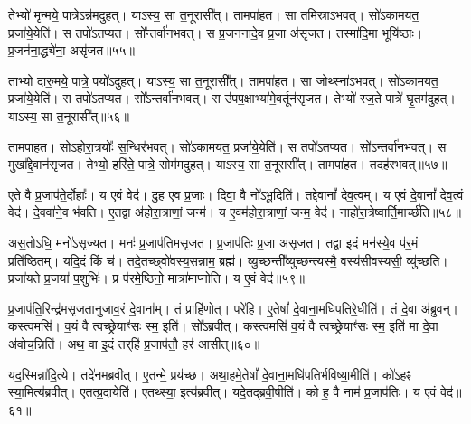 तेभ्यो॑ मृ॒न्मये॒ पात्रे\-ऽन्न॑मदुहत्।
याऽस्य॒ सा त॒नूरासी᳚त्।
तामपा॑हत।
सा तमि॑स्रा\-ऽभवत्।
सो॑ऽकामयत॒ प्रजा॑ये॒येति॑।
स तपो॑\-ऽतप्यत।
सो᳚न्तर्वा॑नभवत्।
स प्र॒जन॑नादे॒व प्र॒जा अ॑\-सृजत।
तस्मा॑दि॒मा भूयि॑ष्ठाः।
प्र॒जन॑ना॒द्ध्ये॑ना॒ असृ॑जत॥५५॥\ip

ताभ्यो॑ दारु॒मये॒ पात्रे॒ पयो॑\-ऽदुहत्।
याऽस्य॒ सा त॒नूरासी᳚त्।
तामपा॑हत।
सा जोथ्स्ना॑\-ऽभवत्।
सो॑ऽकामयत॒ प्रजा॑ये॒येति॑।
स तपो॑\-ऽतप्यत।
सो᳚ऽन्तर्वा॑नभवत्।
स उ॑पप॒क्षाभ्या॑मे॒वर्तून॑\-सृजत।
तेभ्यो॑ रज॒ते पात्रे॑ घृ॒तम॑दुहत्।
याऽस्य॒ सा त॒नूरासी᳚त्॥५६॥\ip

तामपा॑हत।
सो॑ऽहोरा॒त्रयोः᳚ स॒न्धिर॑भवत्।
सो॑ऽकामयत॒ प्रजा॑ये॒येति॑।
स तपो॑\-ऽतप्यत।
सो᳚ऽन्तर्वा॑नभवत्।
स मुखा᳚द्दे॒वान॑\-सृजत।
तेभ्यो॒ हरि॑ते॒ पात्रे॒ सोम॑मदुहत्।
याऽस्य॒ सा त॒नूरासी᳚त्।
तामपा॑हत।
तदह॑रभवत्॥५७॥\ip

ए॒ते वै प्र॒जा\-प॑ते॒र्दोहाः᳚।
य ए॒वं वेद॑।
दु॒ह ए॒व प्र॒जाः।
दिवा॒ वै नो॑\-ऽभू॒दिति॑।
तद्दे॒वानां᳚ देव॒त्वम्।
य ए॒वं दे॒वानां᳚ देव॒त्वं वेद॑।
दे॒ववा॑ने॒व भ॑वति।
ए॒तद्वा अ॑होरा॒त्राणां॒ जन्म॑।
य ए॒वम॑होरा॒त्राणां॒ जन्म॒ वेद॑।
नाहो॑रा॒त्रेष्वार्ति॒मार्च्छ॑ति॥५८॥\ip

अस॒तोऽधि॒ मनो॑\-ऽसृज्यत।
मनः॑ प्र॒जा\-प॑तिम\-सृजत।
प्र॒जा\-प॑तिः प्र॒जा अ॑\-सृजत।
तद्वा इ॒दं मन॑स्ये॒व प॑र॒मं प्रति॑\-ष्ठितम्।
यदि॒दं किं च॑।
तदे॒तच्छ्वो॑वस्य॒सन्नाम॒ ब्रह्म॑।
व्यु॒च्छन्ती᳚व्युच्छन्त्यस्मै॒ वस्य॑सीवस्यसी॒ व्यु॑च्छति।
प्रजा॑यते प्र॒जया॑ प॒शुभिः॑।
प्र प॑रमे॒ष्ठिनो॒ मात्रा॑माप्नोति।
य ए॒वं वेद॑॥५९॥\ip{}

प्र॒जा\-प॑ति॒रिन्द्र॑म\-सृजतानुजाव॒रं दे॒वाना᳚म्।
तं प्राहि॑णोत्।
परे॑हि।
ए॒तेषां᳚ दे॒वाना॒मधि॑पतिरे॒धीति॑।
तं दे॒वा अ॑ब्रुवन्।
कस्त्वमसि॑।
व॒यं वै त्वच्छ्रेयाꣳ॑सः स्म॒ इति॑।
सो᳚ऽब्रवीत्।
कस्त्वमसि॑ व॒यं वै त्वच्छ्रेयाꣳ॑सः स्म॒ इति॑ मा दे॒वा अ॑वोच॒न्निति॑।
अथ॒ वा इ॒दं तर्‌\mbox{}हि॑ प्र॒जा\-प॑तौ॒ हर॑ आसीत्॥६०॥\ip

यद॒स्मिन्ना॑दि॒त्ये।
तदे॑नमब्रवीत्।
ए॒तन्मे॒ प्रय॑च्छ।
अथा॒हमे॒तेषां᳚ दे॒वाना॒मधि॑पतिर्भविष्या॒\-मीति॑।
को॑ऽहꣴ स्या॒मित्य॑ब्रवीत्।
ए॒तत्प्र॒दायेति॑।
ए॒तथ्स्या॒ इत्य॑ब्रवीत्।
यदे॒तद्ब्रवी॒षीति॑।
को ह॒ वै नाम॑ प्र॒जा\-प॑तिः।
य ए॒वं वेद॑॥६१॥\ip

